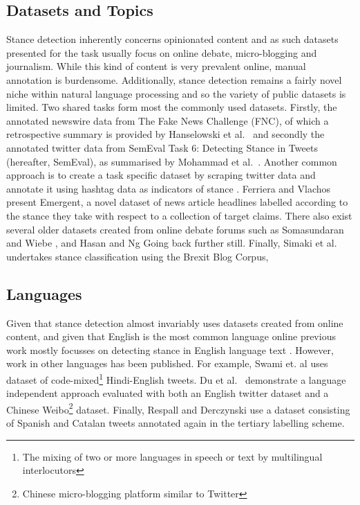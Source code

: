\documentclass[Dissertation.tex]{subfiles}
\begin{document}
\subsection{Datasets and Topics}
 Stance detection inherently concerns opinionated content and as such datasets presented for the task usually focus on online debate, micro-blogging and journalism. While this kind of content is very prevalent online, manual annotation is burdensome. Additionally, stance detection remains a fairly novel niche within natural language processing and so the variety of public datasets is limited. Two shared tasks form most the commonly used datasets. Firstly, the annotated newswire data from The Fake News Challenge (FNC), of which a retrospective summary is provided by Hanselowski et al.\ \cite{hanselowskiRetrospectiveAnalysisFake2018} and secondly the annotated twitter data from SemEval Task 6: Detecting Stance in Tweets (hereafter, SemEval), as summarised by Mohammad et al.\ \cite{mohammadSemEval2016TaskDetecting2016}. Another common approach is to create a task specific dataset by scraping twitter data and annotate it using hashtag data as indicators of stance \cite{swamiEnglishHindiCodeMixedCorpus2018}.  Ferriera and Vlachos \cite{ferreiraEmergentNovelDataset2016} present Emergent, a novel dataset of news article headlines labelled according to the stance they take with respect to a collection of target claims. There also exist several older datasets created from online debate forums such as Somasundaran and Wiebe \cite{somasundaranRecognizingStancesIdeological2010}, and Hasan and Ng \cite{hasanExtraLinguisticConstraintsStance} Going back further still. Finally, Simaki et al.\ \cite{simakiEvaluatingStanceannotatedSentences2018} undertakes stance classification using the Brexit Blog Corpus, 
 
\subsection{Languages}
Given that stance detection almost invariably uses datasets created from online content, and given that English is the most common language online \cite{TopTenInternet} previous work mostly focusses on detecting stance in English language text \cite{ferreiraEmergentNovelDataset2016,hanselowskiRetrospectiveAnalysisFake2018,mohammadSemEval2016TaskDetecting2016,somasundaranRecognizingStancesIdeological2010,hasanExtraLinguisticConstraintsStance,augensteinStanceDetectionBidirectional2016,sobhaniStanceDetectionAnalysis}. However, work in other languages has been published. For example, Swami et. al \cite{swamiEnglishHindiCodeMixedCorpus2018} uses dataset of code-mixed\footnote{The mixing of two or more languages in speech or text by multilingual interlocutors} Hindi-English tweets. Du et al.\  \cite{duStanceClassificationTargetspecific} demonstrate a language independent approach evaluated with both an English twitter dataset and a Chinese Weibo\footnote{Chinese micro-blogging platform similar to Twitter} dataset. Finally, Respall and Derczynski \cite{respallStanceDetectionCatalan} use a dataset consisting of Spanish and Catalan tweets annotated again in the tertiary labelling scheme.
\end{document}
